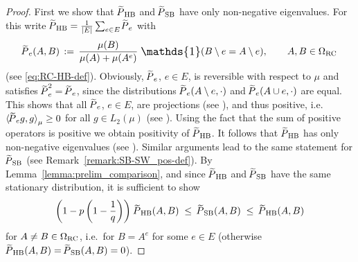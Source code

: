 \documentclass{dis}
\theoremstyle{citing}
\begin{document}
\begin{proof}
First we show that ${{\raisebox{2pt}{ ${\widetilde{{}}}$ }\mkern-14mu P}_{\rm HB}}$ and ${{\raisebox{2pt}{ ${\widetilde{{}}}$ }\mkern-14mu P}_{\rm SB}}$ have only non-negative 
eigenvalues. For this write 
${{\raisebox{2pt}{ ${\widetilde{{}}}$ }\mkern-14mu P}_{\rm HB}}=\frac{1}{{\left\vert {E} \right\vert}}\sum_{e\in E}{\raisebox{2pt}{ ${\widetilde{{}}}$ }\mkern-14mu P}_e$ with 
\[
{\raisebox{2pt}{ ${\widetilde{{}}}$ }\mkern-14mu P}_e(A,B) \,:=\, 
	\frac{\mu(B)}{\mu(A)+\mu(A^e)}\;{\scalebox{1.2}{\raisebox{-0.2mm}{$\mathds{1}$}}}(B\setminus e = A\setminus e), 
	\qquad A,B\in{{\Omega}_{\rm RC}} 
\]
(see \eqref{eq:RC-HB-def}).
Obviously, ${\raisebox{2pt}{ ${\widetilde{{}}}$ }\mkern-14mu P}_e$, $e\in E$, is reversible with respect to $\mu$ 
and satisfies ${\raisebox{2pt}{ ${\widetilde{{}}}$ }\mkern-14mu P}_e^2={\raisebox{2pt}{ ${\widetilde{{}}}$ }\mkern-14mu P}_e$, since the distributions 
${\raisebox{2pt}{ ${\widetilde{{}}}$ }\mkern-14mu P}_e(A\setminus e,\cdot)$ and ${\raisebox{2pt}{ ${\widetilde{{}}}$ }\mkern-14mu P}_e(A\cup e,\cdot)$ are equal. 
This shows that all ${\raisebox{2pt}{ ${\widetilde{{}}}$ }\mkern-14mu P}_e$, $e\in E$, are projections (see 
\cite[Thm.~9.5-1]{Krey}), and thus positive, 
i.e.~${\langle}{\raisebox{2pt}{ ${\widetilde{{}}}$ }\mkern-14mu P}_e g, g{\rangle}_\mu\ge0$ for all $g\in L_2(\mu)$ 
(see \cite[Thm.~9.5-2]{Krey}). 
Using the fact that the sum of positive operators is positive we 
obtain positivity of ${{\raisebox{2pt}{ ${\widetilde{{}}}$ }\mkern-14mu P}_{\rm HB}}$. It follows that ${{\raisebox{2pt}{ ${\widetilde{{}}}$ }\mkern-14mu P}_{\rm HB}}$ has only 
non-negative eigenvalues (see \cite[Obs.~7.1.4]{HJ-matrix}).
Similar arguments lead to the same statement for ${{\raisebox{2pt}{ ${\widetilde{{}}}$ }\mkern-14mu P}_{\rm SB}}$ 
(see Remark~\ref{remark:SB-SW_pos-def}).
By Lemma~\ref{lemma:prelim_comparison}, and since ${{\raisebox{2pt}{ ${\widetilde{{}}}$ }\mkern-14mu P}_{\rm HB}}$ and ${{\raisebox{2pt}{ ${\widetilde{{}}}$ }\mkern-14mu P}_{\rm SB}}$ 
have the same stationary distribution, it 
is sufficient to show
\[
\left(1-p \left(1-\frac1q\right)\right)\, {{\raisebox{2pt}{ ${\widetilde{{}}}$ }\mkern-14mu P}_{\rm HB}}(A,B) 
\;\le\; {{\raisebox{2pt}{ ${\widetilde{{}}}$ }\mkern-14mu P}_{\rm SB}}(A,B) 
\;\le\; {{\raisebox{2pt}{ ${\widetilde{{}}}$ }\mkern-14mu P}_{\rm HB}}(A,B)
\]
for $A\neq B\in{{\Omega}_{\rm RC}}$, i.e.~for $B=A^e$ for 
some $e\in E$ (otherwise ${{\raisebox{2pt}{ ${\widetilde{{}}}$ }\mkern-14mu P}_{\rm HB}}(A,B)={{\raisebox{2pt}{ ${\widetilde{{}}}$ }\mkern-14mu P}_{\rm SB}}(A,B)=0$). 

\end{proof}
\end{document}
